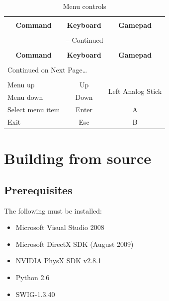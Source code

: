 \documentclass[11pt]{article}
\begin{document}
\begin{center}
\begin{longtable}{lcc}
\caption{Menu controls} \label{menu-controls-table} \\

\hline \hline \\[-2ex]
   \multicolumn{1}{c}{\textbf{Command}} &
   \multicolumn{1}{c}{\textbf{Keyboard}} &
   \multicolumn{1}{c}{\textbf{Gamepad}} \\[0.5ex] \hline
   \\[-1.8ex]
\endfirsthead

\multicolumn{3}{c}{{\tablename} \thetable{} -- Continued} \\[0.5ex]
  \hline \hline \\[-2ex]
  \multicolumn{1}{c}{\textbf{Command}} &
  \multicolumn{1}{c}{\textbf{Keyboard}} &
  \multicolumn{1}{c}{\textbf{Gamepad}} \\[0.5ex] \hline
  \\[-1.8ex]
\endhead

  \multicolumn{3}{l}{{Continued on Next Page\ldots}} \\
\endfoot

  \\[-1.8ex] \hline \hline
\endlastfoot

Menu up & Up & \multirow{2}{*}{Left Analog Stick}\\ 
Menu down & Down \\ 
Select menu item & Enter & A \\ 
Exit & Esc & B \\
\end{longtable}
\end{center}


\section{Building from source}
\label{building-from-source}

\subsection{Prerequisites}

The following must be installed:
  
\begin{itemize}
  \item Microsoft Visual Studio 2008
  \item Microsoft DirectX SDK (August 2009)
  \item NVIDIA PhysX SDK v2.8.1
  \item Python 2.6
  \item SWIG-1.3.40
\end{itemize}  
  
\end{document}
